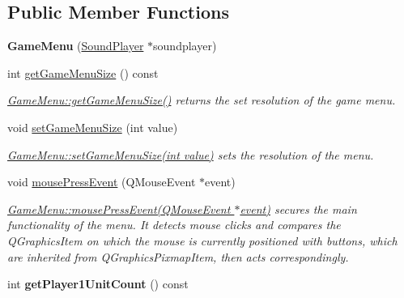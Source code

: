 \subsection*{Public Member Functions}
\begin{DoxyCompactItemize}
\item 
{\bfseries Game\+Menu} (\hyperlink{class_sound_player}{Sound\+Player} $\ast$soundplayer)\hypertarget{class_game_menu_acc7215518fa676e7985aa3f34ca55ef7}{}\label{class_game_menu_acc7215518fa676e7985aa3f34ca55ef7}

\item 
int \hyperlink{class_game_menu_adc24456c629b662425a461b7171da615}{get\+Game\+Menu\+Size} () const 
\begin{DoxyCompactList}\small\item\em \hyperlink{class_game_menu_adc24456c629b662425a461b7171da615}{Game\+Menu\+::get\+Game\+Menu\+Size()} returns the set resolution of the game menu. \end{DoxyCompactList}\item 
void \hyperlink{class_game_menu_aeb35fbd4176b7069dd59395b39d1950c}{set\+Game\+Menu\+Size} (int value)
\begin{DoxyCompactList}\small\item\em \hyperlink{class_game_menu_aeb35fbd4176b7069dd59395b39d1950c}{Game\+Menu\+::set\+Game\+Menu\+Size(int value)} sets the resolution of the menu. \end{DoxyCompactList}\item 
void \hyperlink{class_game_menu_ab043085d1280afd8f33c5e962a171373}{mouse\+Press\+Event} (Q\+Mouse\+Event $\ast$event)\hypertarget{class_game_menu_ab043085d1280afd8f33c5e962a171373}{}\label{class_game_menu_ab043085d1280afd8f33c5e962a171373}

\begin{DoxyCompactList}\small\item\em \hyperlink{class_game_menu_ab043085d1280afd8f33c5e962a171373}{Game\+Menu\+::mouse\+Press\+Event(\+Q\+Mouse\+Event $\ast$event)} secures the main functionality of the menu. It detects mouse clicks and compares the Q\+Graphics\+Item on which the mouse is currently positioned with buttons, which are inherited from Q\+Graphics\+Pixmap\+Item, then acts correspondingly. \end{DoxyCompactList}\item 
int {\bfseries get\+Player1\+Unit\+Count} () const \hypertarget{class_game_menu_ac37e4932a0aa396be6ffb04cad2061b2}{}\label{class_game_menu_ac37e4932a0aa396be6ffb04cad2061b2}


\end{DoxyCompactItemize}
